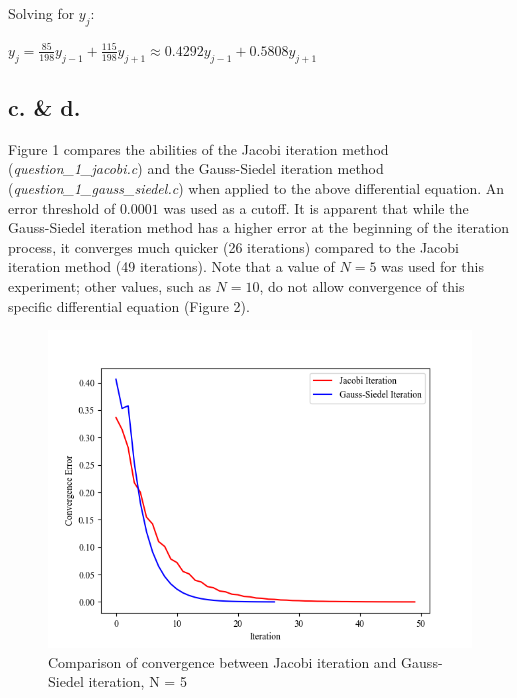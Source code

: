 \documentclass{report}
\begin{document}
	\textit{}
	
	\noindent Solving for $y_j$:
	
	\textit{}
	
	$y_j = \frac{85}{198} y_{j - 1} + \frac{115}{198} y_{j + 1} \approx 0.4292y_{j - 1} + 0.5808y_{j + 1}$
	
	\textit{}
	
	\subsection*{c. \& d.}
	
	Figure 1 compares the abilities of the Jacobi iteration method (\textit{question\_1\_jacobi.c}) and the Gauss-Siedel iteration method (\textit{question\_1\_gauss\_siedel.c}) when applied to the above differential equation. An error threshold of $0.0001$ was used as a cutoff. It is apparent that while the Gauss-Siedel iteration method has a higher error at the beginning of the iteration process, it converges much quicker (26 iterations) compared to the Jacobi iteration method (49 iterations). Note that a value of $N = 5$ was used for this experiment; other values, such as $N = 10$, do not allow convergence of this specific differential equation (Figure 2).
	
	\begin{figure}[!ht]
		\centering
		\includegraphics[scale=0.9]{figures/convergence_curve.png}
		\caption{Comparison of convergence between Jacobi iteration and Gauss-Siedel iteration, N = 5}
	\end{figure}
\end{document}
